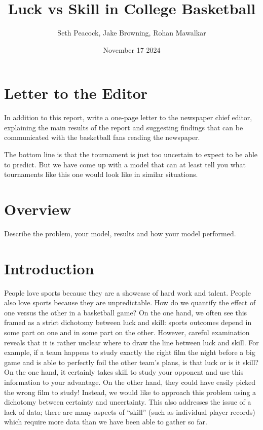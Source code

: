 \documentclass{article}
\title{Luck vs Skill in College Basketball}
\author{Seth Peacock, Jake Browning, Rohan Mawalkar}
\date{November 17 2024}
\begin{document}
\maketitle

\newpage

\section{Letter to the Editor}
In addition to this report, write a one-page letter to the newspaper chief editor, explaining the main results of
the report and suggesting findings that can be communicated with the basketball fans reading the newspaper.

The bottom line is that the tournament is just too uncertain to expect to be able to predict. But we have come up with a model that can at least tell you what tournaments like this one would look like in similar situations.

\newpage

\section{Overview}
Describe the problem, your model, results and how your model performed.

\newpage

\section{Introduction}

People love sports because they are a showcase of hard work and talent. People also love sports because they are unpredictable. How do we quantify the effect of one versus the other in a basketball game? On the one hand, we often see this framed as a strict dichotomy between luck and skill: sports outcomes depend in some part on one and in some part on the other. However, careful examination reveals that it is rather unclear where to draw the line between luck and skill. For example, if a team happens to study exactly the right film the night before a big game and is able to perfectly foil the other team's plans, is that luck or is it skill? On the one hand, it certainly takes skill to study your opponent and use this information to your advantage. On the other hand, they could have easily picked the wrong film to study! Instead, we would like to approach this problem using a dichotomy between certainty and uncertainty.  This also addresses the issue of a lack of data; there are many aspects of ``skill'' (such as individual player records) which require more data than we have been able to gather so far.
\end{document}
